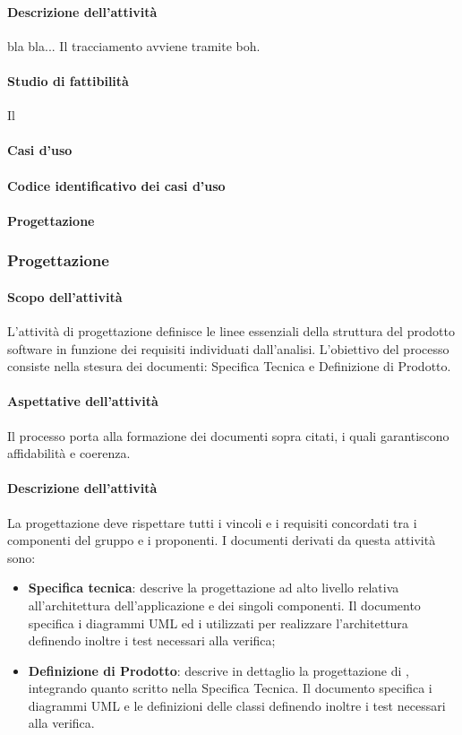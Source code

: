  \paragraph{Descrizione dell'attività}
 bla bla... \ARdocRR
 Il tracciamento avviene tramite boh.
 \paragraph{Studio di fattibilità}
 Il \RESP \SFdocRR
 \paragraph{Casi d'uso}

 \paragraph{Codice identificativo dei casi d'uso}

 \paragraph{Progettazione}

\subsubsection{Progettazione}
 \paragraph{Scopo dell'attività}
L'attività di progettazione definisce le linee essenziali della struttura del prodotto software in
funzione dei requisiti individuati dall'analisi. L'obiettivo del processo consiste nella stesura dei
documenti: Specifica Tecnica e Definizione di Prodotto.
 \paragraph{Aspettative dell'attività}
Il processo porta alla formazione dei documenti sopra citati, i quali garantiscono affidabilità e
coerenza.
 \paragraph{Descrizione dell'attività}
La progettazione deve rispettare tutti i vincoli e i requisiti concordati tra i componenti del gruppo
e i proponenti. I documenti derivati da questa attività sono:
\begin{itemize}
	\item \textbf{Specifica tecnica}: descrive la progettazione ad alto livello relativa all'architettura dell'applicazione
e dei singoli componenti. Il documento specifica i diagrammi UML ed i  utilizzati per realizzare l'architettura definendo inoltre i test necessari alla verifica;
	\item \textbf{Definizione di Prodotto}: descrive in dettaglio la progettazione di , integrando
quanto scritto nella Specifica Tecnica. Il documento specifica i diagrammi UML e le
definizioni delle classi definendo inoltre i test necessari alla verifica.
\end{itemize}
